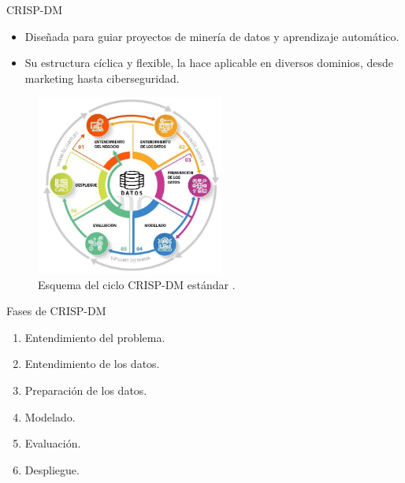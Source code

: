 \begin{frame}{CRISP-DM}
\begin{itemize}
	\item Diseñada para guiar proyectos de minería de datos y aprendizaje automático.
	\item Su estructura cíclica y flexible, la hace aplicable en diversos dominios, desde marketing hasta ciberseguridad.
\end{itemize}
	
    \begin{figure}[H]
    \centering
    \includegraphics[width=0.55\textwidth]{../Memoria/img/metodologia/crispdm.jpeg}
    \caption{Esquema del ciclo CRISP-DM estándar \cite{haya_crisp_dm}.}
    \label{fig:CRISP-DM}
\end{figure}
    
\end{frame}


\begin{frame}{Fases de CRISP-DM}
      \begin{enumerate}
	      \item Entendimiento del problema.
	      \item Entendimiento de los datos.	      
	      \item Preparación de los datos.
	      \item Modelado.
	      \item Evaluación.
	      \item Despliegue.
      \end{enumerate}
\end{frame}